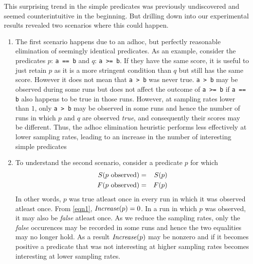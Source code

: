 This surprising trend in the simple predicates was previously undiscovered
and seemed counterintuitive in the beginning.  But drilling down into our
experimental results revealed two scenarios where this could happen.

\begin{enumerate}
\item The first scenario happens due to an adhoc, but perfectly reasonable
elimination of seemingly identical predicates.  As an example, consider the
predicates $p$: \texttt{a == b} and $q$: \texttt{a >= b}.  If they have the
same score, it is useful to just retain $p$ as it is a more stringent
condition than $q$ but still has the same score.  However it does not mean
that \texttt{a > b} was never true.  \texttt{a > b} may be observed  during 
some runs but does not affect the outcome of \texttt{a >= b} if \texttt{a == b}
also happens to be true in those runs.  However, at sampling rates lower than
$1$, only \texttt{a > b} may be observed in some runs and hence the number of
runs in which $p$ and $q$ are observed \emph{true}, and consequently their
scores may be different.  Thus, the adhoc elimination heuristic performs 
less effectively at lower sampling rates, leading to an increase in the 
number of interesting simple predicates

\item To understand the second scenario, consider a predicate $p$ for which
\begin{eqnarray*}
 S(\text{$p$ observed}) &=& S(p) \\
 F(\text{$p$ observed}) &=& F(p) \\
\end{eqnarray*}
In other words, $p$ was true atleast once in every run in which it was 
observed atleast once.  From \autoref{eqn1}, $\mathit{Increase}(p) = 0$.  In a run 
in which $p$ was observed, it may also be \emph{false} atleast once.  As we
reduce the sampling rates, only the \emph{false} occurences may be recorded
in some runs and hence the two equalities may no longer hold.  As a result
$\mathit{Increase}(p)$ may be nonzero and if it becomes positive a predicate that
was not interesting at higher sampling rates becomes interesting at lower 
sampling rates.
\end{enumerate}
